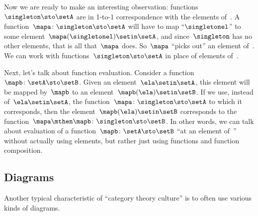 {\begin{example}
    Now we are ready to make an interesting observation: functions~$\singleton \sto \setA$ are in 1-to-1 correspondence with the elements of~\setA.
    A function~$\mapa\colon \singleton \sto \setA$ will have to map ``$\singletonel$'' to some element~$\mapa(\singletonel) \setin\setA$, and since~$\singleton$ has no other elements, that is all that~$\mapa$ does.
    So~$\mapa$ ``picks out'' an element of~\setA.
    We can work with functions~$\singleton \sto \setA$ in place of elements of~\setA.

    Next, let's talk about function evaluation.
    Consider a function~$\mapb \colon \setA \sto \setB$.
    Given an element~$\ela \setin\setA$, this element will be mapped by~$\mapb$ to an element~$\mapb(\ela) \setin\setB$.
    If we use, instead of~$\ela \setin\setA$, the function~$\mapa \colon \singleton \sto \setA$ to which it corresponds, then the element~$\mapb(\ela) \setin\setB$ corresponds to the function~$\mapa \mthen \mapb\colon \singleton \sto \setB$.
    In other words, we can talk about evaluation of a function~$\mapb \colon \setA \sto \setB$ ``at an element of~\setA'' without actually using elements, but rather just using functions and function composition.
\end{example}

\subsection{Diagrams}

Another typical characteristic of ``category theory culture'' is to often use various kinds of diagrams.


}
